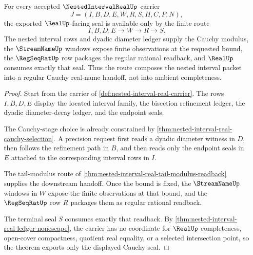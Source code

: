 \begin{theorem}
\label{thm:nested-interval-real-cauchy-seal}
For every accepted $\NestedIntervalRealUp$ carrier
$$
J=(I,B,D,E,W,R,S,H,C,P,N),
$$
the exported $\RealUp$-facing seal is available only by the finite route
$$
I,B,D,E \longrightarrow W \longrightarrow R \longrightarrow S .
$$
The nested interval rows and dyadic diameter ledger supply the Cauchy modulus, the $\StreamNameUp$ windows expose finite observations at the requested bound, the $\RegSeqRatUp$ row packages the regular rational readback, and $\RealUp$ consumes exactly that seal. Thus the route composes the nested interval packet into a regular Cauchy real-name handoff, not into ambient completeness.
\end{theorem}
\begin{proof}
Start from the carrier of \autoref{def:nested-interval-real-carrier}. The rows $I,B,D,E$ display the located interval family, the bisection refinement ledger, the dyadic diameter-decay ledger, and the endpoint seals.

The Cauchy-stage choice is already constrained by \autoref{thm:nested-interval-real-cauchy-selection}. A precision request first reads a dyadic diameter witness in $D$, then follows the refinement path in $B$, and then reads only the endpoint seals in $E$ attached to the corresponding interval rows in $I$.

The tail-modulus route of \autoref{thm:nested-interval-real-tail-modulus-readback} supplies the downstream handoff. Once the bound is fixed, the $\StreamNameUp$ windows in $W$ expose the finite observations at that bound, and the $\RegSeqRatUp$ row $R$ packages them as regular rational readback.

The terminal seal $S$ consumes exactly that readback. By \autoref{thm:nested-interval-real-ledger-nonescape}, the carrier has no coordinate for $\RealUp$ completeness, open-cover compactness, quotient real equality, or a selected intersection point, so the theorem exports only the displayed Cauchy seal.
\end{proof}

